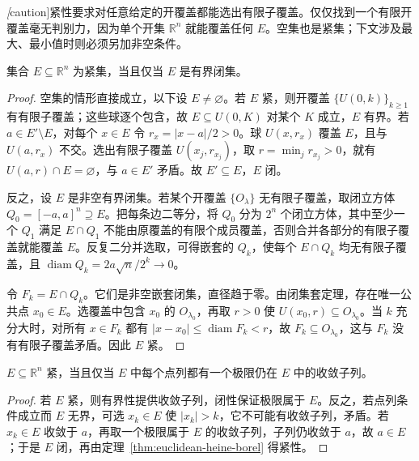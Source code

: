 \documentclass[UTF8,12pt,a4paper,fontset=fandol]{ctexbook}
\begin{document}
\emph[caution]{紧性要求对任意给定的开覆盖都能选出有限子覆盖。}仅仅找到一个有限开覆盖毫无判别力，因为单个开集 $\mathbb R^n$ 就能覆盖任何 $E$。空集也是紧集；下文涉及最大、最小值时则必须另加非空条件。

\begin{theorem}
\label{thm:euclidean-heine-borel}
集合 $E\subseteq\mathbb R^n$ 为紧集，当且仅当 $E$ 是有界闭集。
\end{theorem}

\begin{proof}
空集的情形直接成立，以下设 $E\neq\varnothing$。若 $E$ 紧，则开覆盖 $\{U(0,k)\}_{k\geq1}$ 有有限子覆盖；这些球逐个包含，故 $E\subseteq U(0,K)$ 对某个 $K$ 成立，$E$ 有界。若 $a\in E'\setminus E$，对每个 $x\in E$ 令 $r_x=|x-a|/2>0$。球 $U(x,r_x)$ 覆盖 $E$，且与 $U(a,r_x)$ 不交。选出有限子覆盖 $U(x_j,r_{x_j})$，取 $r=\min_jr_{x_j}>0$，就有 $U(a,r)\cap E=\varnothing$，与 $a\in E'$ 矛盾。故 $E'\subseteq E$，$E$ 闭。

反之，设 $E$ 是非空有界闭集。若某个开覆盖 $\{O_\lambda\}$ 无有限子覆盖，取闭立方体 $Q_0=[-a,a]^n\supseteq E$。把每条边二等分，将 $Q_0$ 分为 $2^n$ 个闭立方体，其中至少一个 $Q_1$ 满足 $E\cap Q_1$ 不能由原覆盖的有限个成员覆盖，否则合并各部分的有限子覆盖就能覆盖 $E$。反复二分并选取，可得嵌套的 $Q_k$，使每个 $E\cap Q_k$ 均无有限子覆盖，且 $\operatorname{diam}Q_k=2a\sqrt n/2^k\to0$。

令 $F_k=E\cap Q_k$。它们是非空嵌套闭集，直径趋于零。由闭集套定理，存在唯一公共点 $x_0\in E$。选覆盖中包含 $x_0$ 的 $O_{\lambda_0}$，再取 $r>0$ 使 $U(x_0,r)\subseteq O_{\lambda_0}$。当 $k$ 充分大时，对所有 $x\in F_k$ 都有 $|x-x_0|\leq\operatorname{diam}F_k<r$，故 $F_k\subseteq O_{\lambda_0}$，这与 $F_k$ 没有有限子覆盖矛盾。因此 $E$ 紧。
\end{proof}

\begin{corollary}[紧性的点列刻画]
\label{cor:euclidean-sequential-compactness}
$E\subseteq\mathbb R^n$ 紧，当且仅当 $E$ 中每个点列都有一个极限仍在 $E$ 中的收敛子列。
\end{corollary}

\begin{proof}
若 $E$ 紧，则有界性提供收敛子列，闭性保证极限属于 $E$。反之，若点列条件成立而 $E$ 无界，可选 $x_k\in E$ 使 $|x_k|>k$，它不可能有收敛子列，矛盾。若 $x_k\in E$ 收敛于 $a$，再取一个极限属于 $E$ 的收敛子列，子列仍收敛于 $a$，故 $a\in E$；于是 $E$ 闭，再由定理~\ref{thm:euclidean-heine-borel} 得紧性。
\end{proof}
\end{document}
